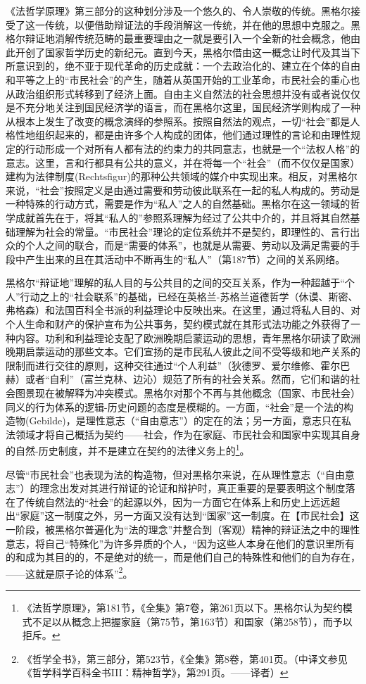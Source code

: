 《法哲学原理》第三部分的这种划分涉及一个悠久的、令人崇敬的传统。黑格尔接受了这一传统，以便借助辩证法的手段消解这一传统，并在他的思想中克服之。黑格尔辩证地消解传统范畴的最重要理由之一就是要引入一个全新的社会概念，他由此开创了国家哲学历史的新纪元。直到今天，黑格尔借由这一概念让时代及其当下所意识到的，绝不亚于现代革命的历史成就：一个去政治化的、建立在个体的自由和平等之上的“市民社会”的产生，随着从英国开始的工业革命，市民社会的重心也从政治组织形式转移到了经济上面。自由主义自然法的社会思想并没有或者说仅仅是不充分地关注到国民经济学的语言，而在黑格尔这里，国民经济学则构成了一种从根本上发生了改变的概念演绎的参照系。按照自然法的观点，一切“社会”都是人格性地组织起来的，都是由许多个人构成的团体，他们通过理性的言论和由理性规定的行动形成一个对所有人都有法的约束力的共同意志，也就是一个“法权人格”的意志。这里，言和行都具有公共的意义，并在将每一个“社会”（而不仅仅是国家）建构为法律制度(Rechtsfigur)的那种公共领域的媒介中实现出来。相反，对黑格尔来说，“社会”按照定义是由通过需要和劳动彼此联系在一起的私人构成的。劳动是一种特殊的行动方式，需要是作为“私人”之人的自然基础。黑格尔在这一领域的哲学成就首先在于，将其“私人的”参照系理解为经过了公共中介的，并且将其自然基础理解为社会的常量。“市民社会”理论的定位系统并不是契约，即理性的、言行出众的个人之间的联合，而是“需要的体系”，也就是从需要、劳动以及满足需要的手段中产生出来的且在其活动中不断再生的“私人”（第187节）之间的关系网络。

黑格尔“辩证地”理解的私人目的与公共目的之间的交互关系，作为一种超越于“个人”行动之上的“社会联系”的基础，已经在英格兰-苏格兰道德哲学（休谟、斯密、弗格森）和法国百科全书派的利益理论中反映出来。在这里，通过将私人目的、对个人生命和财产的保护宣布为公共事务，契约模式就在其形式法功能之外获得了一种内容。功利和利益理论支配了欧洲晚期启蒙运动的思想，青年黑格尔研读了欧洲晚期启蒙运动的那些文本。它们宣扬的是市民私人彼此之间不受等级和地产关系的限制而进行交往的原则，这种交往通过“个人利益”（狄德罗、爱尔维修、霍尔巴赫）或者“自利”（富兰克林、边沁）规范了所有的社会关系。然而，它们和谐的社会图景现在被解释为冲突模式。黑格尔对那个不再与其他概念（国家、市民社会）同义的行为体系的逻辑-历史问题的态度是模糊的。一方面，“社会”是一个法的构造物(Gebilde)，是理性意志（“自由意志”）的定在的法；另一方面，意志只在私法领域才将自己概括为契约——社会，作为在家庭、市民社会和国家中实现其自身的自然-历史制度，并不是建立在契约的法律义务上的\footnote{《法哲学原理》，第181节，《全集》第7卷，第261页以下。黑格尔认为契约模式不足以从概念上把握家庭（第75节，第163节）和国家（第258节），而予以拒斥。}。

尽管“市民社会”也表现为法的构造物，但对黑格尔来说，在从理性意志（“自由意志”）的理念出发对其进行辩证的论证和辩护时，真正重要的是要表明这个制度落在了传统自然法的“社会”的起源以外，因为一方面它在体系上和历史上远远超出“家庭”这一制度之外，另一方面又没有达到“国家”这一制度。在【市民社会】这一阶段，被黑格尔普遍化为“法的理念”并整合到（客观）精神的辩证法之中的理性意志，将自己“特殊化”为许多异质的个人，“因为这些人本身在他们的意识里所有的和成为其目的的，不是绝对的统一，而是他们自己的特殊性和他们的自为存在，——这就是原子论的体系”\footnote{《哲学全书》，第三部分，第523节，《全集》第8卷，第401页。（中译文参见《哲学科学百科全书III：精神哲学》，第291页。——译者）}。

